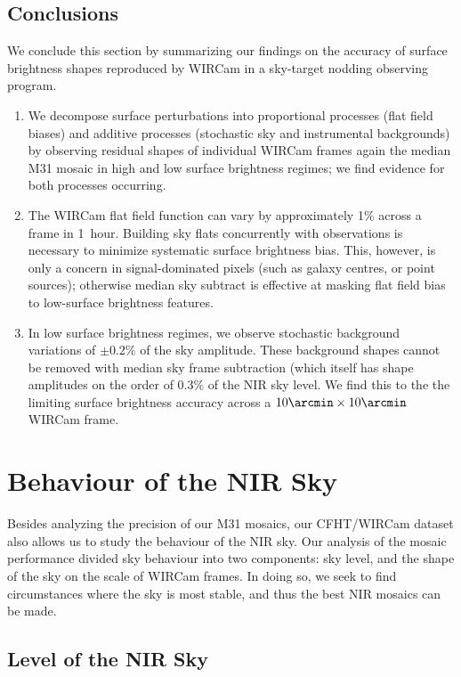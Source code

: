 \documentclass[iop]{emulateapj}
\begin{document}
\subsection{Conclusions}
\label{sec:shapeconclusions}

We conclude this section by summarizing our findings on the accuracy of surface brightness shapes reproduced by WIRCam in a sky-target nodding observing program.

\begin{enumerate}
  \item We decompose surface perturbations into proportional processes (flat field biases) and additive processes (stochastic sky and instrumental backgrounds) by observing residual shapes of individual WIRCam frames again the median M31 mosaic in high and low surface brightness regimes; we find evidence for both processes occurring.
  \item The WIRCam flat field function can vary by approximately 1\% across a frame in 1~hour. Building sky flats concurrently with observations is necessary to minimize systematic surface brightness bias. This, however, is only a concern in signal-dominated pixels (such as galaxy centres, or point sources); otherwise median sky subtract is effective at masking flat field bias to low-surface brightness features.
  \item In low surface brightness regimes, we observe stochastic background variations of $\pm 0.2$\% of the sky amplitude. These background shapes cannot be removed with median sky frame subtraction (which itself has shape amplitudes on the order of $0.3\%$ of the NIR sky level. We find this to the the limiting surface brightness accuracy across a $10\arcmin \times 10\arcmin$ WIRCam frame.
\end{enumerate}

\section{Behaviour of the NIR Sky}
\label{sec:skybehaviour}

Besides analyzing the precision of our M31 mosaics, our CFHT/WIRCam dataset also allows us to study the behaviour of the NIR sky.
Our analysis of the mosaic performance divided sky behaviour into two components: sky level, and the shape of the sky on the scale of WIRCam frames.
In doing so, we seek to find circumstances where the sky is most stable, and thus the best NIR mosaics can be made.

\subsection{Level of the NIR Sky}
\label{sec:skylevel}
\end{document}
